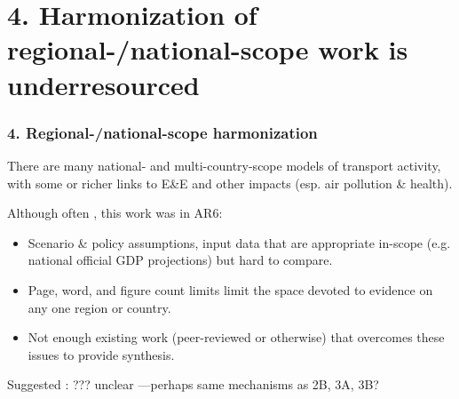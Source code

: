 \documentclass[12pt,aspectratio=169]{beamer}
\begin{document}
\section{4. Harmonization of regional-/national-scope work is underresourced}
\begin{frame}
\frametitle{4. Regional-/national-scope harmonization}

There are many national- and multi-country-scope models of transport activity, with some or richer links to E\&E and other impacts (esp. air pollution \& health).

\smallskip
Although often , this work was  in AR6:
\begin{itemize}
  \item Scenario \& policy assumptions, input data that are appropriate in-scope (e.g. national official GDP projections) but hard to compare.
  \item Page, word, and figure count limits limit the space devoted to evidence on any one region or country.
  \item Not enough existing work (peer-reviewed or otherwise) that overcomes these issues to provide synthesis.
\end{itemize}

\bigskip
Suggested : ??? unclear —perhaps same mechanisms as 2B, 3A, 3B?
\end{frame}
\end{document}

